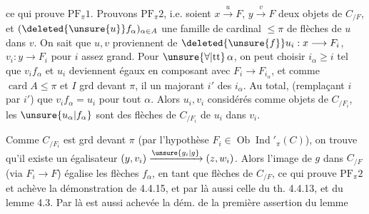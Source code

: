 ce qui prouve $\mathrm{PF}_\pi1$. Prouvons $\mathrm{PF}_\pi2$, i.e. soient $x\xrightarrow{u}F$, $y\xrightarrow{v}F$ deux objets de $C_{/F}$, et $(\deleted{\unsure{u}}f_\alpha)_{\alpha\in A}$ une famille de cardinal $\leq\pi$ de flèches de $u$ dans $v$.
On sait que $u,v$ proviennent de $\deleted{\unsure{f}}u_i:x\longrightarrow F_i$, $v_i:y\longrightarrow F_i$ pour $i$ assez grand.
Pour $\unsure{\forall|\mathrm{tt}}\,\alpha$, on peut choisir $i_\alpha\geq i$ tel que $v_if_\alpha$ et $u_i$ deviennent égaux en composant avec $F_i\longrightarrow F_{i_\alpha}$, et comme $\operatorname{card} A\leq\pi$ et $I$ grd devant $\pi$, il   un majorant $i'$ des $i_\alpha$. Au total,   (remplaçant $i$ par $i'$) que $v_i f_\alpha=u_i$ pour tout $\alpha$. Alors $u_i,v_i$  considérés comme objets de $C_{/F_i}$, les $\unsure{u_\alpha|f_\alpha}$ sont des flèches de $C_{/F_i}$ de $u_i$ dans $v_i$.
\margin{$\unsure{=}$}

Comme $C_{/F_i}$ est grd devant $\pi$ (par l'hypothèse $F_i\in\operatorname{Ob}\operatorname{Ind}'_\pi(C)$), on trouve qu'il existe un égalisateur $(y,v_i)\xrightarrow{\unsure{g_i|g}}(z,w_i)$.
Alors l'image de $g$ dans $C_{/F}$ (via $F_i\longrightarrow F$) égalise les flèches $f_\alpha$, en tant que flèches de $C_{/F}$, ce qui prouve $\mathrm{PF}_\pi2$ et achève la démonstration de 4.4.15, et par là aussi celle du th. 4.4.13, et du lemme 4.3. Par là est aussi achevée la dém. de la première assertion du lemme
